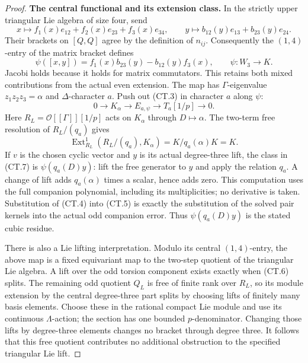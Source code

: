 \begin{proof}
\par\medskip\noindent\textbf{The central functional and its extension class.}
In the strictly upper triangular Lie algebra of size four, send
\[
 x\longmapsto f_1(x)e_{12}+f_2(x)e_{23}+f_3(x)e_{34},\qquad
 y\longmapsto b_{12}(y)e_{13}+b_{23}(y)e_{24}.
\]
Their brackets on \([Q,Q]\) agree by the definition of \(n_{ij}\).
Consequently the \((1,4)\)-entry of the matrix bracket defines
\[
 \psi([x,y])=f_1(x)b_{23}(y)-b_{12}(y)f_3(x),\qquad
 \psi:W_3\longrightarrow K.
 \tag{CT.5}
\]
Jacobi holds because it holds for matrix commutators. This retains both
mixed contributions from the actual even extension. The map has
\(\Gamma\)-eigenvalue \(z_1z_2z_3=\alpha\) and \(\Delta\)-character
\(a\). Push out (CT.3) in character \(a\) along \(\psi\):
\[
 0\longrightarrow K_\alpha\longrightarrow E_{a,\psi}
 \longrightarrow T_a[1/p]\longrightarrow0.
 \tag{CT.6}
\]
Here \(R_L=\mathcal O[[\Gamma]][1/p]\) acts on \(K_\alpha\) through
\(D\mapsto\alpha\). The two-term free resolution of
\(R_L/(q_a)\) gives
\[
 \operatorname{Ext}^1_{R_L}(R_L/(q_a),K_\alpha)
   =K/q_a(\alpha)K=K.
 \tag{CT.7}
\]
If \(v\) is the chosen cyclic vector and \(y\) is its actual
degree-three lift, the class in (CT.7) is
\(\psi(q_a(D)y)\): lift the free generator to \(y\) and apply the
relation \(q_a\). A change of lift adds \(q_a(\alpha)\) times a
scalar, hence adds zero. This computation uses the full companion
polynomial, including its multiplicities; no derivative is taken.
Substitution of (CT.4) into (CT.5) is exactly the substitution of the
solved pair kernels into the actual odd companion error. Thus
\(\psi(q_a(D)y)\) is the stated cubic residue.

There is also a Lie lifting interpretation. Modulo its central
\((1,4)\)-entry, the above map is a fixed equivariant map to the
two-step quotient of the triangular Lie algebra. A lift over the odd
torsion component exists exactly when (CT.6) splits. The remaining
odd quotient \(Q_L\) is free of finite rank over \(R_L\), so its
module extension by the central degree-three part splits by choosing
lifts of finitely many basis elements. Choose these in the rational
compact Lie module and use its continuous \(\Lambda\)-action; the
section has one bounded \(p\)-denominator. Changing those lifts by
degree-three elements changes no bracket through degree three.
It follows that this free quotient contributes no additional
obstruction to the specified triangular Lie lift.
\end{proof}

